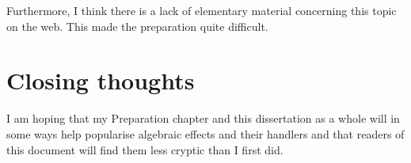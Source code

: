 \documentclass[class=article, crop=false]{standalone}
\begin{document}
Furthermore, I think there is a lack of elementary material concerning this topic on the web. This made the preparation
quite difficult.

\section{Closing thoughts}

I am hoping that my Preparation chapter and this dissertation as a whole will in some ways help popularise algebraic effects
and their handlers and that readers of this document will find them less cryptic than I first did.
\end{document}
